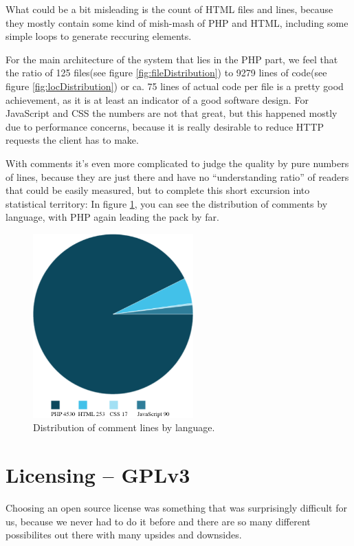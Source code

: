What could be a bit misleading is the count of HTML files and lines, because they mostly contain some kind of mish-mash of PHP and HTML, including some simple loops to generate reccuring elements.

For the main architecture of the system that lies in the PHP part, we feel that the ratio of 125 files(see figure \ref{fig:fileDistribution}) to 9279 lines of code(see figure \ref{fig:locDistribution}) or ca. 75 lines of actual code per file is a pretty good achievement, as it is at least an indicator of a good software design. For JavaScript and CSS the numbers 
are not that great, but this happened mostly due to performance concerns, because it is 
really desirable to reduce HTTP requests the client has to make.

With comments it's even more complicated to judge the quality by pure numbers of lines,
because they are just there and have no \enquote{understanding ratio} of readers that could be easily measured, but to complete this short excursion into statistical territory: In figure \ref{fig:commentDistribution}, you can see the distribution of comments by language, with PHP again leading the pack by far.

\begin{figure}[!h]
  \centering
    \includegraphics[width=0.55\textwidth]{images/comments.png}
  \caption{Distribution of comment lines by language.}
  \label{fig:commentDistribution}
\end{figure}

\section{Licensing -- GPLv3}

Choosing an open source license was something that was surprisingly difficult for us,
because we never had to do it before and there are so many different possibilites out there with many upsides and downsides.

